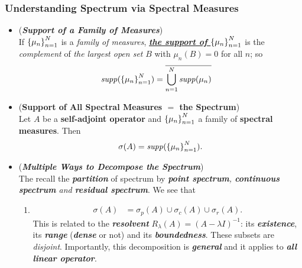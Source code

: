 \documentclass[11pt]{article}
\begin{document}
\subsubsection{Understanding Spectrum via Spectral Measures}
\begin{itemize}
\item \begin{definition} (\emph{\textbf{Support of a Family of Measures}})\\
If $\left\{\mu_n\right\}_{n=1}^{N}$ is a \emph{family of measures}, \underline{\emph{\textbf{the support of $\left\{\mu_n\right\}_{n=1}^{N}$}}} is the 
\emph{complement} of \emph{the largest open set} $Β$ with $\mu_n(B) = 0$ for all $n$; so 
\begin{align*}
\text{\emph{supp}}(\left\{\mu_n\right\}_{n=1}^{N}) &= \overline{\bigcup_{n=1}^{N}\text{\emph{supp}}(\mu_n)}
\end{align*}
\end{definition}

\item \begin{proposition} (\textbf{Support of All Spectral Measures $=$ the Spectrum}) \citep{reed1980methods}\\
Let $A$ be a \textbf{self-adjoint operator} and $\left\{\mu_n\right\}_{n=1}^{N}$ a family of \textbf{spectral measures}. Then 
\begin{align*}
\sigma(A) = \text{\emph{supp}}(\left\{\mu_n\right\}_{n=1}^{N}).
\end{align*}
\end{proposition}


\item \begin{remark} (\emph{\textbf{Multiple Ways to Decompose the Spectrum}})\\
The recall the \emph{\textbf{partition}} of spectrum by \emph{\textbf{point spectrum}, \textbf{continuous spectrum} and \textbf{residual spectrum}}. We see that 
\begin{enumerate}
\item \begin{align*}
\sigma(A)&= \sigma_{p}(A) \cup \sigma_{c}(A) \cup \sigma_{r}(A).
\end{align*} This is related to the \emph{\textbf{resolvent}}  $R_{\lambda}(A) = (A - \lambda I)^{-1}$: its \emph{\textbf{existence}}, its \emph{\textbf{range}} (\emph{\textbf{dense}} or not) and its \emph{\textbf{boundedness}}. These subsets are \emph{disjoint}. Importantly, this decomposition is \emph{\textbf{general}} and it applies to \emph{\textbf{all  linear operator}}.


\end{enumerate}
\end{remark}
\end{itemize}
\end{document}
